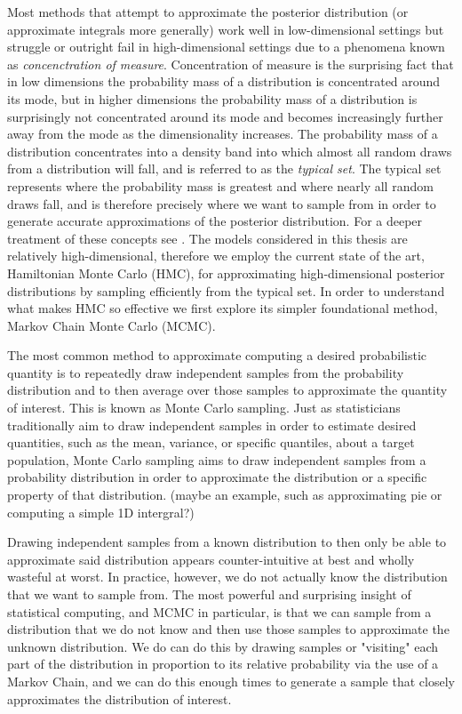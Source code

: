 Most methods that attempt to approximate the posterior distribution (or approximate integrals more generally) work well in low-dimensional settings but struggle or outright fail in high-dimensional settings due to a phenomena known as \textit{concenctration of measure}. Concentration of measure is the surprising fact that in low dimensions the probability mass of a distribution is concentrated around its mode, but in higher dimensions the probability mass of a distribution is surprisingly not concentrated around its mode and becomes increasingly further away from the mode as the dimensionality increases. The probability mass of a distribution concentrates into a density band into which almost all random draws from a distribution will fall, and is referred to as the \textit{typical set}. The typical set represents where the probability mass is greatest and where nearly all random draws fall, and is therefore precisely where we want to sample from in order to generate accurate approximations of the posterior distribution. For a deeper treatment of these concepts see \cite{Betancourt2017} \cite{Carpenter2017}. The models considered in this thesis are relatively high-dimensional, therefore we employ the current state of the art, Hamiltonian Monte Carlo (HMC), for approximating high-dimensional posterior distributions by sampling efficiently from the typical set. In order to understand what makes HMC so effective we first explore its simpler foundational method, Markov Chain Monte Carlo (MCMC).

The most common method to approximate computing a desired probabilistic quantity is to repeatedly draw independent samples from the probability distribution and to then average over those samples to approximate the quantity of interest. This is known as Monte Carlo sampling.  Just as statisticians traditionally aim to draw independent samples in order to estimate desired quantities, such as the mean, variance, or specific quantiles, about a target population, Monte Carlo sampling aims to draw independent samples from a probability distribution in order to approximate the distribution or a specific property of that distribution. (maybe an example, such as approximating pie or computing a simple 1D intergral?)

Drawing independent samples from a known distribution to then only be able to approximate said distribution appears counter-intuitive at best and wholly wasteful at worst. In practice, however, we do not actually know the distribution that we want to sample from. The most powerful and surprising insight of statistical computing, and MCMC in particular, is that we can sample from a distribution that we do not know and then use those samples to approximate the unknown distribution. We do can do this by drawing samples or "visiting" each part of the distribution in proportion to its relative probability via the use of a Markov Chain, and we can do this enough times to generate a sample that closely approximates the distribution of interest.

